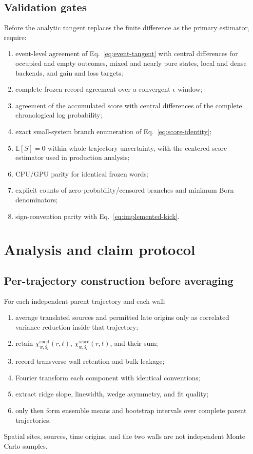 \documentclass[aps,prb,onecolumn,nofootinbib,superscriptaddress]{revtex4-2}
\newcommand{\E}{\mathbb{E}}
\newcommand{\bxi}{\bm{\xi}}
\newcommand{\cond}{\mathrm{cond}}
\begin{document}
\subsection{Validation gates}

Before the analytic tangent replaces the finite difference as the primary
estimator, require:
\begin{enumerate}
  \item event-level agreement of Eq.~\eqref{eq:event-tangent} with central
  differences for occupied and empty outcomes, mixed and nearly pure states,
  local and dense backends, and gain and loss targets;
  \item complete frozen-record agreement over a convergent $\epsilon$ window;
  \item agreement of the accumulated score with central differences of the
  complete chronological log probability;
  \item exact small-system branch enumeration of
  Eq.~\eqref{eq:score-identity};
  \item $\E[S]=0$ within whole-trajectory uncertainty, with the centered score
  estimator used in production analysis;
  \item CPU/GPU parity for identical frozen words;
  \item explicit counts of zero-probability/censored branches and minimum Born
  denominators;
  \item sign-convention parity with Eq.~\eqref{eq:implemented-kick}.
\end{enumerate}

\section{Analysis and claim protocol}
\label{sec:claim-protocol}

\subsection{Per-trajectory construction before averaging}

For each independent parent trajectory and each wall:
\begin{enumerate}
  \item average translated sources and permitted late origins only as correlated
  variance reduction inside that trajectory;
  \item retain $\chi^{\cond}_{w,\bxi}(r,t)$,
  $\chi^{\mathrm{score}}_{w,\bxi}(r,t)$, and their sum;
  \item record transverse wall retention and bulk leakage;
  \item Fourier transform each component with identical conventions;
  \item extract ridge slope, linewidth, wedge asymmetry, and fit quality;
  \item only then form ensemble means and bootstrap intervals over complete
  parent trajectories.
\end{enumerate}
Spatial sites, sources, time origins, and the two walls are not independent
Monte Carlo samples.
\end{document}
